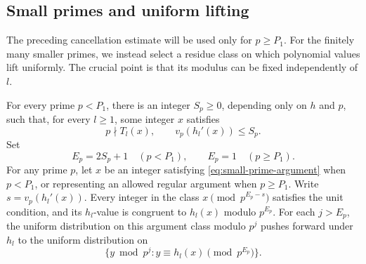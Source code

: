 \subsection{Small primes and uniform lifting}

The preceding cancellation estimate will be used only for $p\ge P_1$.
For the finitely many smaller primes, we instead select a residue class
on which polynomial values lift uniformly.  The crucial point is that
its modulus can be fixed independently of $l$.

\begin{lemma}\label{lem:local-lifting}
For every prime $p<P_1$, there is an integer $S_p\ge0$, depending only
on $h$ and $p$, such that, for every $l\ge1$, some integer $x$ satisfies
\begin{equation}\label{eq:small-prime-argument}
 p\nmid T_l(x),\qquad v_p(h_l'(x))\le S_p.
\end{equation}
Set
\begin{equation}\label{eq:local-modulus-exponents}
 E_p=2S_p+1\quad(p<P_1),\qquad E_p=1\quad(p\ge P_1).
\end{equation}
For any prime $p$, let $x$ be an integer satisfying
\eqref{eq:small-prime-argument} when $p<P_1$, or representing an allowed
regular argument when $p\ge P_1$.  Write $s=v_p(h_l'(x))$.
Every integer in the class $x\pmod{p^{E_p-s}}$ satisfies the unit
condition, and its $h_l$-value is congruent to $h_l(x)$ modulo $p^{E_p}$.
For each $j>E_p$, the uniform distribution on this argument class
modulo $p^j$ pushes forward under $h_l$ to the uniform distribution on
\[
 \{y\bmod p^j:y\equiv h_l(x)\pmod{p^{E_p}}\}.
\]
\end{lemma}

